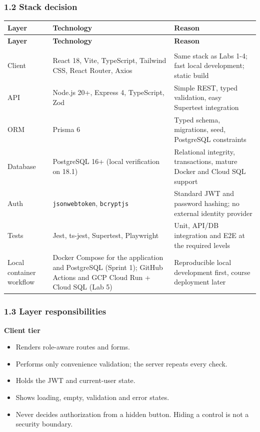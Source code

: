 \documentclass[12pt,a4paper]{article}
\begin{document}
\subsubsection*{1.2 Stack decision}
{\setlength{\tabcolsep}{3pt}\renewcommand{\arraystretch}{1.08}\small
\begin{longtable}{@{}>{\raggedright\arraybackslash}p{}>{\raggedright\arraybackslash}p{}>{\raggedright\arraybackslash}p{}@{}}
\toprule
\textbf{Layer} & \textbf{Technology} & \textbf{Reason} \\
\midrule
\endfirsthead
\toprule
\textbf{Layer} & \textbf{Technology} & \textbf{Reason} \\
\midrule
\endhead
\midrule
\multicolumn{3}{r}{\footnotesize\textit{Continued on next page}}\\
\endfoot
\bottomrule
\endlastfoot
Client & React 18, Vite, TypeScript, Tailwind CSS, React Router, Axios & Same stack as Labs 1-4; fast local development; static build \\
API & Node.js 20+, Express 4, TypeScript, Zod & Simple REST, typed validation, easy Supertest integration \\
ORM & Prisma 6 & Typed schema, migrations, seed, PostgreSQL constraints \\
Database & PostgreSQL 16+ (local verification on 18.1) & Relational integrity, transactions, mature Docker and Cloud SQL support \\
Auth & \texttt{jsonwebtoken}, \texttt{bcryptjs} & Standard JWT and password hashing; no external identity provider \\
Tests & Jest, ts-jest, Supertest, Playwright & Unit, API/DB integration and E2E at the required levels \\
Local container workflow & Docker Compose for the application and PostgreSQL (Sprint 1); GitHub Actions and GCP Cloud Run + Cloud SQL (Lab 5) & Reproducible local development first, course deployment later \\
\end{longtable}}

\subsubsection*{1.3 Layer responsibilities}
\textbf{Client tier}

\begin{itemize}[leftmargin=*]
\item Renders role-aware routes and forms.
\item Performs only convenience validation; the server repeats every check.
\item Holds the JWT and current-user state.
\item Shows loading, empty, validation and error states.
\item Never decides authorization from a hidden button. Hiding a control is not a security boundary.
\end{itemize}
\end{document}
